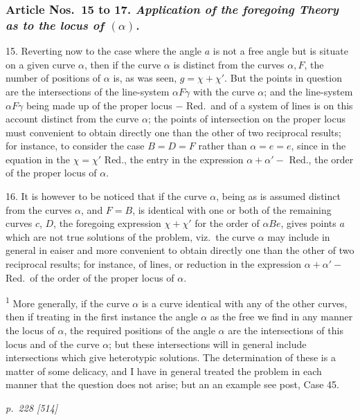 \documentclass[11pt,a4paper]{book}
\begin{document}
\bigskip
\subsubsection*{Article Nos.\ 15 to 17.  \textit{Application of the foregoing Theory as to the locus of $(\alpha)$.}}

15. Reverting now to the case where the angle $a$ is not a free angle but is
situate on a given curve $\alpha$, then if the curve $\alpha$ is distinct from the curves $\alpha, F$,
the number of positions of $\alpha$ is, as was seen, $g = \chi + \chi'$.  But the points in question
are the intersections of the line-system $\alpha F\gamma$ with the curve $\alpha$; and the line-system
$\alpha F\gamma$ being made up of the proper locus $- $ Red.\ and of a system of lines is on this
account distinct from the curve $\alpha$; the points of intersection on the proper locus must
convenient to obtain directly one than the other of two reciprocal results; for instance,
to consider the case $B = D = F$ rather than $\alpha = e = e$, since in the equation in the
$\chi=\chi'$ Red., the entry in the expression $\alpha+\alpha'-$ Red., the order of the proper
locus of $\alpha$.

16. It is however to be noticed that if the curve $\alpha$, being as is assumed distinct
from the curves $\alpha$, and $F=B$, is identical with one or both of the remaining curves
$c$, $D$, the foregoing expression $\chi+\chi'$ for the order of $\alpha Be$, gives points $a$ which are not true
solutions of the problem, viz.\ the curve $\alpha$ may include in general in eaiser and more
convenient to obtain directly one than the other of two reciprocal results; for instance,
of lines, or reduction in the expression $\alpha + \alpha' - $ Red.\ of the order of the proper
locus of $\alpha$.

\bigskip
\noindent\textsuperscript{1} More generally, if the curve $\alpha$ is a curve identical with any of the other curves, then if treating in
the first instance the angle $\alpha$ as the free we find in any manner the locus of $\alpha$, the required positions of the
angle $\alpha$ are the intersections of this locus and of the curve $\alpha$; but these intersections will in general
include intersections which give heterotypic solutions. The determination of these is a matter of some
delicacy, and I have in general treated the problem in each manner that the question does not arise; but
an an example see post, Case 45.

\clearpage

\bigskip
\textit{p.~228 [514]}
\smallskip
\end{document}
